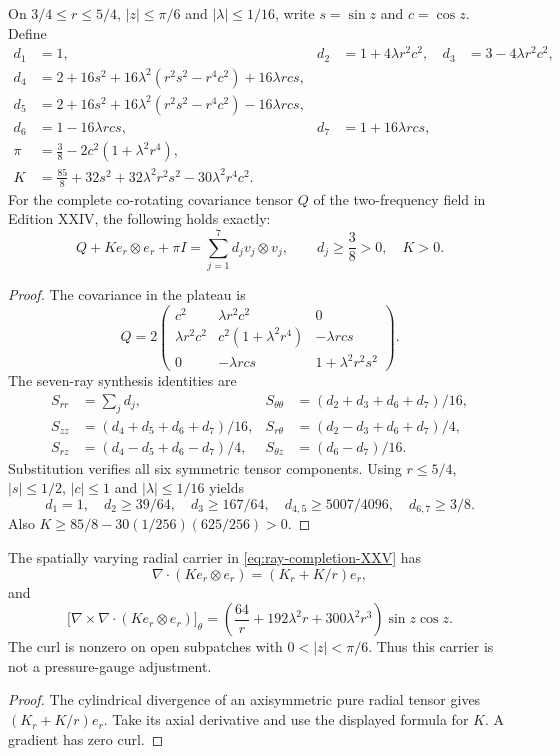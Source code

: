 \begin{theorem}
\label{thm:ray-carrier-XXV}
On $3/4\le r\le5/4$, $|z|\le\pi/6$ and
$|\lambda|\le1/16$, write $s=\sin z$ and $c=\cos z$.
Define
\begin{align*}
d_1&=1,&
d_2&=1+4\lambda r^2c^2,&
d_3&=3-4\lambda r^2c^2,\\
d_4&=2+16s^2+16\lambda^2(r^2s^2-r^4c^2)
  +16\lambda rcs,\\
d_5&=2+16s^2+16\lambda^2(r^2s^2-r^4c^2)
  -16\lambda rcs,\\
d_6&=1-16\lambda rcs,&
d_7&=1+16\lambda rcs,\\
\pi&=\frac38-2c^2(1+\lambda^2r^4),\\
K&=\frac{85}{8}+32s^2+32\lambda^2r^2s^2
                     -30\lambda^2r^4c^2.
\end{align*}
For the complete co-rotating covariance tensor $Q$ of the
two-frequency field in Edition XXIV, the following holds exactly:
\begin{equation}\label{eq:ray-completion-XXV}
\boxed{Q+K e_r\otimes e_r+\pi I
=\sum_{j=1}^7 d_jv_j\otimes v_j,\qquad
d_j\ge\frac38>0,\quad K>0.}
\end{equation}
\end{theorem}
\begin{proof}
The covariance in the plateau is
\[
Q=2\begin{pmatrix}
c^2&\lambda r^2c^2&0\\
\lambda r^2c^2&c^2(1+\lambda^2r^4)&-\lambda rcs\\
0&-\lambda rcs&1+\lambda^2r^2s^2
\end{pmatrix}.
\]
The seven-ray synthesis identities are
\begin{align*}
S_{rr}&=\sum_jd_j,&
S_{\theta\theta}&=(d_2+d_3+d_6+d_7)/16,\\
S_{zz}&=(d_4+d_5+d_6+d_7)/16,&
S_{r\theta}&=(d_2-d_3+d_6+d_7)/4,\\
S_{rz}&=(d_4-d_5+d_6-d_7)/4,&
S_{\theta z}&=(d_6-d_7)/16.
\end{align*}
Substitution verifies all six symmetric tensor components.
Using $r\le5/4$, $|s|\le1/2$, $|c|\le1$ and
$|\lambda|\le1/16$ yields
\[
d_1=1,\quad d_2\ge39/64,\quad d_3\ge167/64,\quad
d_{4,5}\ge5007/4096,\quad d_{6,7}\ge3/8.
\]
Also $K\ge85/8-30(1/256)(625/256)>0$.
\end{proof}

\begin{proposition}
\label{prop:ray-carrier-curl-XXV}
The spatially varying radial carrier in
\eqref{eq:ray-completion-XXV} has
\[
\nabla\cdot(K e_r\otimes e_r)=(K_r+K/r)e_r,
\]
and
\[
\boxed{\bigl[\nabla\times\nabla\cdot
(K e_r\otimes e_r)\bigr]_\theta
=\left(\frac{64}{r}+192\lambda^2r+300\lambda^2r^3\right)
\sin z\cos z.}
\]
The curl is nonzero on open subpatches with $0<|z|<\pi/6$.
Thus this carrier is not a pressure-gauge adjustment.
\end{proposition}
\begin{proof}
The cylindrical divergence of an axisymmetric pure radial
tensor gives $(K_r+K/r)e_r$.
Take its axial derivative and use the displayed formula for $K$.
A gradient has zero curl.
\end{proof}

